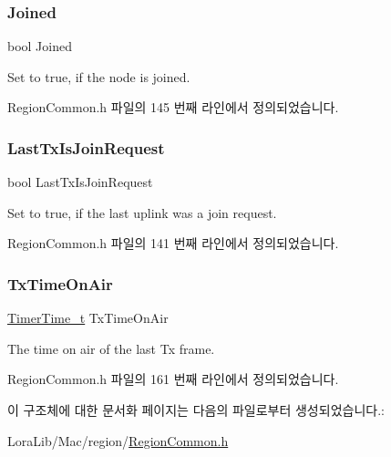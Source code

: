 \subsubsection{\texorpdfstring{Joined}{Joined}}
{\footnotesize\ttfamily bool Joined}

Set to true, if the node is joined. 

Region\+Common.\+h 파일의 145 번째 라인에서 정의되었습니다.

\mbox{\label{structs_region_common_calc_back_off_params_a4088d0ca2ff21fd5cdc110e14816dd53}} 
\subsubsection{\texorpdfstring{Last\+Tx\+Is\+Join\+Request}{LastTxIsJoinRequest}}
{\footnotesize\ttfamily bool Last\+Tx\+Is\+Join\+Request}

Set to true, if the last uplink was a join request. 

Region\+Common.\+h 파일의 141 번째 라인에서 정의되었습니다.

\mbox{\label{structs_region_common_calc_back_off_params_aa17a8607485db100d315e74853dd217e}} 
\subsubsection{\texorpdfstring{Tx\+Time\+On\+Air}{TxTimeOnAir}}
{\footnotesize\ttfamily \mbox{\hyperlink{utilities_8h_a4215ca43d3e953099ea758ce428599d0}{Timer\+Time\+\_\+t}} Tx\+Time\+On\+Air}

The time on air of the last Tx frame. 

Region\+Common.\+h 파일의 161 번째 라인에서 정의되었습니다.



이 구조체에 대한 문서화 페이지는 다음의 파일로부터 생성되었습니다.\+:\begin{DoxyCompactItemize}
\item 
Lora\+Lib/\+Mac/region/\mbox{\hyperlink{_region_common_8h}{Region\+Common.\+h}}\end{DoxyCompactItemize}
